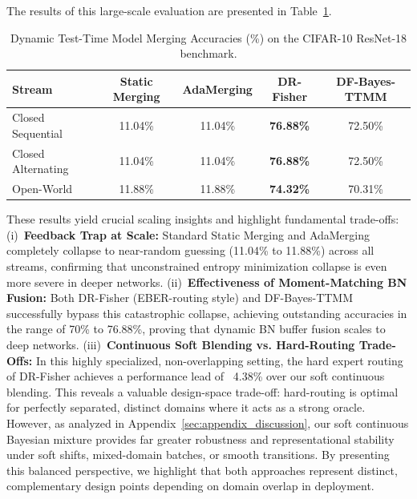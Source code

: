 \documentclass{article}
\theoremstyle{plain}
\theoremstyle{definition}
\theoremstyle{remark}
\begin{document}
The results of this large-scale evaluation are presented in Table~\ref{tab:cifar_results}.

\begin{table}[t]
\centering
\caption{Dynamic Test-Time Model Merging Accuracies (\%) on the CIFAR-10 ResNet-18 benchmark.}
\label{tab:cifar_results}
\vskip 0.1in
\begin{center}
\begin{small}
\begin{sc}
\begin{tabular}{lcccc}
\toprule
Stream & Static Merging & AdaMerging & DR-Fisher & DF-Bayes-TTMM \\
\midrule
Closed Sequential & 11.04\% & 11.04\% & \textbf{76.88\%} & 72.50\% \\
Closed Alternating & 11.04\% & 11.04\% & \textbf{76.88\%} & 72.50\% \\
Open-World & 11.88\% & 11.88\% & \textbf{74.32\%} & 70.31\% \\
\bottomrule
\end{tabular}
\end{sc}
\end{small}
\end{center}
\end{table}

These results yield crucial scaling insights and highlight fundamental trade-offs:
(i)~\textbf{Feedback Trap at Scale:} Standard Static Merging and AdaMerging completely collapse
to near-random guessing (11.04\% to 11.88\%) across all streams, confirming that unconstrained entropy minimization collapse is even more severe in deeper networks.
(ii)~\textbf{Effectiveness of Moment-Matching BN Fusion:} Both DR-Fisher (EBER-routing style) and
DF-Bayes-TTMM successfully bypass this catastrophic collapse, achieving outstanding accuracies in
the range of 70\% to 76.88\%, proving that dynamic BN buffer fusion scales to deep networks.
(iii)~\textbf{Continuous Soft Blending vs. Hard-Routing Trade-Offs:} In this highly specialized, non-overlapping setting, the hard expert routing of DR-Fisher achieves a performance lead of ~4.38\% over our soft continuous blending. This reveals a valuable design-space trade-off: hard-routing is optimal for perfectly separated, distinct domains where it acts as a strong oracle. However, as analyzed in Appendix~\ref{sec:appendix_discussion}, our soft continuous Bayesian mixture provides far greater robustness and representational stability under soft shifts, mixed-domain batches, or smooth transitions. By presenting this balanced perspective, we highlight that both approaches represent distinct, complementary design points depending on domain overlap in deployment.
\end{document}
